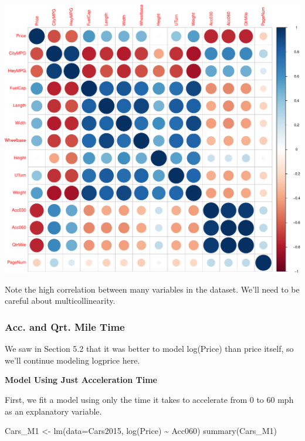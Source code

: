 \documentclass[
  letterpaper,
  DIV=11,
  numbers=noendperiod]{scrreprt}
\newenvironment{Shaded}{\begin{snugshade}}{\end{snugshade}}
\newcommand{\AttributeTok}[1]{\textcolor[rgb]{0.40,0.45,0.13}{#1}}
\newcommand{\FunctionTok}[1]{\textcolor[rgb]{0.28,0.35,0.67}{#1}}
\newcommand{\NormalTok}[1]{\textcolor[rgb]{0.00,0.23,0.31}{#1}}
\newcommand{\OtherTok}[1]{\textcolor[rgb]{0.00,0.23,0.31}{#1}}
\newcommand{\SpecialCharTok}[1]{\textcolor[rgb]{0.37,0.37,0.37}{#1}}
\begin{document}
\includegraphics{Ch5_files/figure-pdf/unnamed-chunk-56-1.pdf}

Note the high correlation between many variables in the dataset. We'll
need to be careful about multicollinearity.

\subsubsection{Acc. and Qrt. Mile Time}\label{acc.-and-qrt.-mile-time}

We saw in Section 5.2 that it was better to model log(Price) than price
itself, so we'll continue modeling logprice here.

\textbf{Model Using Just Acceleration Time}

First, we fit a model using only the time it takes to accelerate from 0
to 60 mph as an explanatory variable.

\begin{Shaded}
\begin{Highlighting}[]
\NormalTok{Cars\_M1 }\OtherTok{\textless{}{-}} \FunctionTok{lm}\NormalTok{(}\AttributeTok{data=}\NormalTok{Cars2015, }\FunctionTok{log}\NormalTok{(Price) }\SpecialCharTok{\textasciitilde{}}\NormalTok{ Acc060)}
\FunctionTok{summary}\NormalTok{(Cars\_M1)}
\end{Highlighting}
\end{Shaded}
\end{document}
